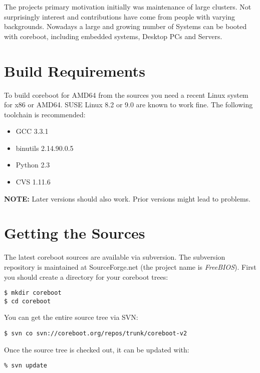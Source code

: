 \documentclass[titlepage,12pt]{article}
\begin{document}
The projects primary motivation initially was maintenance of large
clusters. Not surprisingly interest and contributions have come from
people with varying backgrounds.  Nowadays a large and growing number of
Systems can be booted with coreboot, including embedded systems,
Desktop PCs and Servers.

%
%

\section{Build Requirements}
To build coreboot for AMD64 from the sources you need a recent Linux
system for x86 or AMD64. SUSE Linux 8.2 or 9.0 are known to work fine.
The following toolchain is recommended:

 \begin{itemize}
 \item GCC 3.3.1
 \item binutils 2.14.90.0.5
 \item Python 2.3
 \item CVS 1.11.6
 \end{itemize}

\textbf{NOTE:} Later versions should also work. Prior versions might lead to problems.

\newpage

%
%

\section{Getting the Sources}

The latest coreboot sources are available via subversion. The subversion
repository is maintained at SourceForge.net (the project name is
\emph{FreeBIOS}).  First you should create a directory for your
coreboot trees:

{ \small
\begin{verbatim}
$ mkdir coreboot
$ cd coreboot
\end{verbatim}
}

You can get the entire source tree via SVN:

{ \small
\begin{verbatim}
$ svn co svn://coreboot.org/repos/trunk/coreboot-v2
\end{verbatim}
}

Once the source tree is checked out, it can be updated with:

{ \small
\begin{verbatim}
% svn update
\end{verbatim}
}
\end{document}
